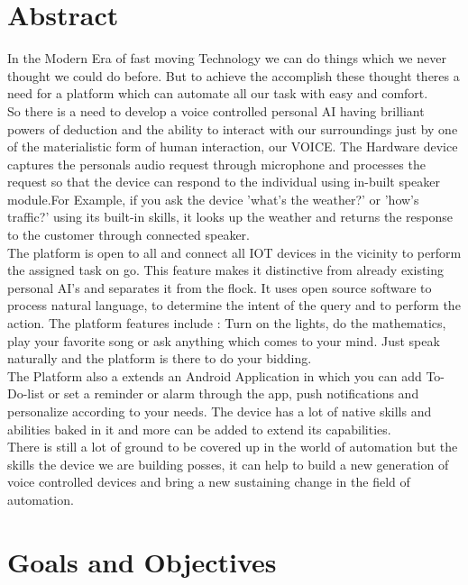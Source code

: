 \documentclass[16pt,oneside,a4paper]{article}
\begin{document}
\section{Abstract}
In the Modern Era of fast moving Technology we can do things which we never thought we could do before. But to achieve the accomplish these thought theres a need for a platform which can automate all our task with easy and comfort.\\

So there is a need to develop a voice controlled personal AI having brilliant powers of deduction and the ability to interact with our surroundings just by one of the materialistic form of human interaction, our VOICE. The Hardware device captures the personals audio request through microphone and  processes the request so that the device can respond to the individual using in-built speaker module.For Example, if you ask the device 'what's the weather?' or 'how's traffic?' using its built-in skills, it looks up the weather and returns the response to the customer through connected speaker.\\

\noindent
The platform is open to all and connect all IOT devices in the vicinity to perform the assigned task on go. This feature makes it distinctive from already existing personal AI’s and separates it from the flock. It uses open source software to process natural language, to determine the intent of the query and to perform the action. The platform features include : Turn on the lights, do the mathematics, play your favorite song or ask anything which comes to your mind. Just speak naturally and the platform is there to do your bidding.\\

\noindent
The Platform also a extends an Android Application in which you can add To-Do-list or set a reminder or alarm through the app, push notifications and personalize according to your needs. The device has a lot of native skills and abilities baked in it and more can be added to extend its capabilities.\\

\noindent
There is still a lot of ground to be covered up in the world of automation but the skills the device we are building posses, it can help to build a new generation of voice controlled devices and bring a new  sustaining change in the field of automation.\\

\section{Goals and Objectives}
\end{document}
